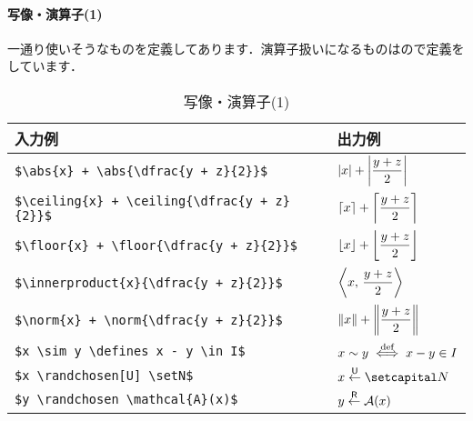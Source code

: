 \documentclass[uplatex]{jsreport}
\begin{document}
\paragraph{写像・演算子(1)} 一通り使いそうなものを定義してあります．演算子扱いになるものはので定義をしています．
\par
\begin{table}[htbp]
  \centering
  \caption{写像・演算子(1)}
  \label{table:2.operaor1}
  \renewcommand{\arraystretch}{1.5}
  \begin{tabular}{ll}\hline
    入力例 & 出力例 \\ \hline 
    \verb|$\abs{x} + \abs{\dfrac{y + z}{2}}$| & $\left| x \right| + \left| \dfrac{y + z}{2} \right|$ \\
    \verb|$\ceiling{x} + \ceiling{\dfrac{y + z}{2}}$| & $\left\lceil x \right\rceil + \left\lceil \dfrac{y + z}{2} \right\rceil$ \\
    \verb|$\floor{x} + \floor{\dfrac{y + z}{2}}$| & $\left\lfloor x \right\rfloor + \left\lfloor \dfrac{y + z}{2} \right\rfloor$ \\
    \verb|$\innerproduct{x}{\dfrac{y + z}{2}}$| & $\left\langle x,\,\dfrac{y + z}{2}\right\rangle$ \\
    \verb|$\norm{x} + \norm{\dfrac{y + z}{2}}$| & $\left\| x \right\| + \left\| \dfrac{y + z}{2} \right\|$ \\
    \verb|$x \sim y \defines x - y \in I$|& $x \sim y \overset{\text{def}}{\iff} x - y \in I$ \\
    \verb|$x \randchosen[U] \setN$| & $x \randchosen[U] \setN$ \\
    \verb|$y \randchosen \mathcal{A}(x)$| & $y \randchosen \mathcal{A}(x)$ \\\hline
  \end{tabular}\par
\end{table}\par
\end{document}

